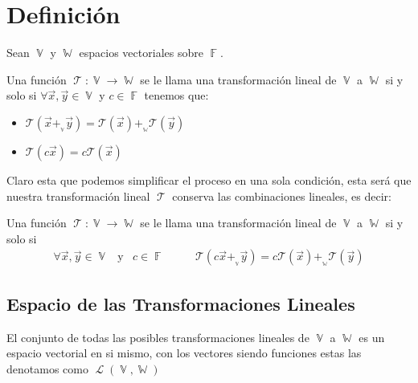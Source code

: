 \documentclass[12pt, fleqn]{report}                             %
\DeclareMathOperator \Space {\quad}                             %
\DeclareMathOperator \MegaSpace {\quad \quad}                   %
\DeclareMathOperator \MiniSpace {\;}                            %
\newcommand \Also {\MiniSpace \text{y} \MiniSpace}              %
\theoremstyle{break}                                            %
\DeclareMathOperator \GenericField {\mathbb{F}}                 %
\DeclareMathOperator \VectorSet    {\mathbb{V}}                 %
\DeclareMathOperator \SubVectorSet {\mathbb{W}}                 %
\DeclareMathOperator \LinTrans {\mathcal{T}}                    %
\DeclareMathOperator \Laplace {\mathcal{L}}                     %
\newcommand{\Wrap}[1]    {\left( #1 \right)}                    %
\newcommand{\FnLinTrans}[1]{\mathcal{T}\Wrap{#1}}               %
\begin{document}
        \section{Definición}


            Sean $\VectorSet$ y $\SubVectorSet$ espacios vectoriales sobre $\GenericField$.

            Una función $\LinTrans: \VectorSet \to \SubVectorSet$ se le llama una transformación lineal
            de $\VectorSet$ a $\SubVectorSet$ si y solo si 
            $\forall \vec x, \vec y \in \VectorSet$ y $c \in \GenericField$ tenemos que:
            \begin{itemize}
                \item 
                    $\FnLinTrans{\vec x +_{{}_{\VectorSet}} \vec y} 
                        = \FnLinTrans{\vec x} +_{{}_{\SubVectorSet}} \FnLinTrans{\vec y}$
                \item $\FnLinTrans{c\vec x} = c\FnLinTrans{\vec x}$
            \end{itemize}

            Claro esta que podemos simplificar el proceso en una sola condición, esta será que nuestra
            transformación lineal $\LinTrans$ conserva las combinaciones lineales, es decir:

            Una función $\LinTrans: \VectorSet \to \SubVectorSet$ se le llama una transformación lineal
            de $\VectorSet$ a $\SubVectorSet$ si y solo si 
            \begin{align*}
                \forall \vec x, \vec y \in \VectorSet 
                    \Also c \in \GenericField
                \MegaSpace
                \FnLinTrans{c \vec x +_{{}_{\VectorSet}} \vec y} 
                        = c\FnLinTrans{\vec x} +_{{}_{\SubVectorSet}} \FnLinTrans{\vec y}
            \end{align*}


            \vspace{1em}
            \subsection{Espacio de las Transformaciones Lineales}


                El conjunto de todas las posibles transformaciones lineales de $\VectorSet$
                a $\SubVectorSet$ es un espacio vectorial en si mismo, con los vectores
                siendo funciones estas las denotamos como $\Laplace(\VectorSet, \SubVectorSet)$
\end{document}
